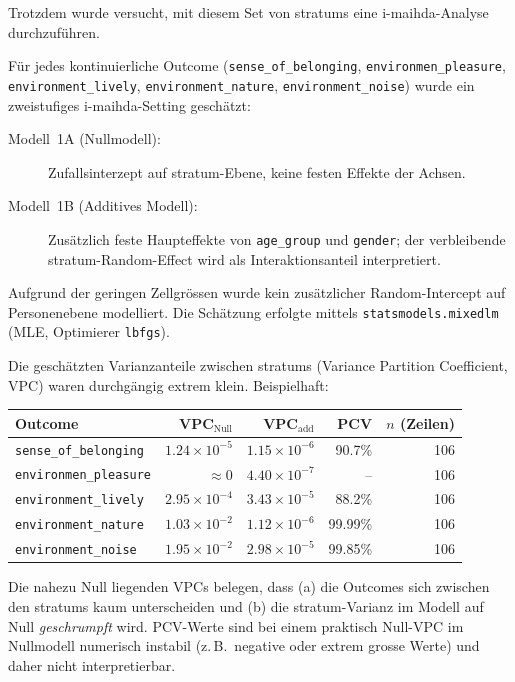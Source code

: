 Trotzdem wurde versucht, mit diesem Set von \glspl{stratum} eine \gls{i-maihda}-Analyse durchzuführen.

Für jedes kontinuierliche Outcome (\texttt{sense\_of\_belonging}, \texttt{environmen\_pleasure}, \texttt{environment\_lively}, \texttt{environment\_nature}, \texttt{environment\_noise}) wurde ein zweistufiges \gls{i-maihda}-Setting geschätzt:
\begin{description}
    \item[Modell~1A (Nullmodell):] Zufallsinterzept auf \gls{stratum}-Ebene, keine festen Effekte der Achsen.
    \item[Modell~1B (Additives Modell):] Zusätzlich feste Haupteffekte von \texttt{age\_group} und \texttt{gender}; der verbleibende \gls{stratum}-Random-Effect wird als Interaktionsanteil interpretiert.
\end{description}
Aufgrund der geringen Zellgrössen wurde kein zusätzlicher Random-Intercept auf Personenebene modelliert. Die Schätzung erfolgte mittels \texttt{statsmodels.mixedlm} (MLE, Optimierer \texttt{lbfgs}).


Die geschätzten Varianzanteile zwischen \glspl{stratum} (Variance Partition Coefficient, VPC) waren durchgängig extrem klein. Beispielhaft:

\begin{center}
\begin{tabular}{lrrrr}
\toprule
Outcome & VPC$_{\text{Null}}$ & VPC$_{\text{add}}$ & PCV & $n$ (Zeilen) \\
\midrule
\texttt{sense\_of\_belonging}      & $1.24\times 10^{-5}$ & $1.15\times 10^{-6}$ & 90.7\% & 106 \\
\texttt{environmen\_pleasure}      & $\approx 0$          & $4.40\times 10^{-7}$ & --      & 106 \\
\texttt{environment\_lively}       & $2.95\times 10^{-4}$ & $3.43\times 10^{-5}$ & 88.2\%  & 106 \\
\texttt{environment\_nature}       & $1.03\times 10^{-2}$ & $1.12\times 10^{-6}$ & 99.99\% & 106 \\
\texttt{environment\_noise}        & $1.95\times 10^{-2}$ & $2.98\times 10^{-5}$ & 99.85\% & 106 \\
\bottomrule
\end{tabular}
\end{center}

Die nahezu Null liegenden VPCs belegen, dass (a) die Outcomes sich zwischen den \glspl{stratum} kaum unterscheiden und (b) die \gls{stratum}-Varianz im Modell auf Null \emph{geschrumpft} wird. PCV-Werte sind bei einem praktisch Null-VPC im Nullmodell numerisch instabil (z.\,B.\ negative oder extrem grosse Werte) und daher nicht interpretierbar.

